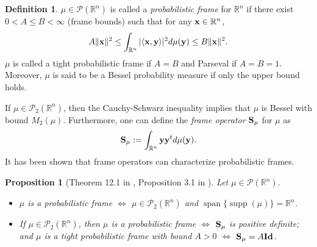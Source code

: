 \documentclass{amsart}
\numberwithin{equation}{section}
\DeclareMathOperator{\supp}{supp}
\DeclareMathOperator{\spanning}{span}
\theoremstyle{plain}
\newtheorem{proposition}[theorem]{Proposition}
\theoremstyle{definition}
\newtheorem{definition}[theorem]{Definition}
\begin{document}
\begin{definition}
$\mu \in  \mathcal{P}(\mathbb{R}^n)$ is called a \textit{probabilistic frame} for $\mathbb{R}^n$ if there exist $0<A \leq B < \infty$ (frame bounds) such that for any ${\bf x} \in \mathbb{R}^n$, 
\begin{equation*}
    A \Vert {\bf x}  \Vert^2 \leq\int_{\mathbb{R}^n} \vert \langle {\bf x},{\bf y} \rangle \vert ^2 d\mu({\bf y})  \leq B \Vert {\bf x}  \Vert^2.
\end{equation*}
$\mu$ is called a tight probabilistic frame if $A = B$ and Parseval if $A = B=1$. Moreover, $\mu$ is said to be a Bessel probability measure if only the upper bound holds. 
\end{definition}


If $\mu \in  \mathcal{P}_2(\mathbb{R}^n)$, then the Cauchy-Schwarz inequality implies that $\mu$ is Bessel with bound $M_2(\mu) $. Furthermore, one can define the \textit{frame operator} ${\bf S}_\mu$ for $\mu$  as 
    \begin{equation*}
          {\bf S}_\mu := \int_{\mathbb{R}^n}  {\bf y} {\bf y}^t d \mu({\bf y}).
    \end{equation*}
It has been shown that frame operators can characterize probabilistic frames. 


 \begin{proposition}[Theorem 12.1 in \cite{ehler2013probabilistic}, Proposition 3.1 in \cite{maslouhi2019probabilistic}] \label{TAcharacterization}
Let $\mu  \in \mathcal{P}(\mathbb{R}^n)$. 
\begin{itemize}
    \item[$(1)$] $\mu$ is a probabilistic frame  $\Leftrightarrow$ $\mu \in \mathcal{P}_2(\mathbb{R}^n)$ and $\spanning\{\supp(\mu)\} = \mathbb{R}^n$.
    
     \item[$(2)$] If $\mu  \in \mathcal{P}_2(\mathbb{R}^n)$, then $\mu$ is a probabilistic frame   $\Leftrightarrow$ ${\bf S}_{\mu}$ is positive definite; and $\mu$ is a tight probabilistic frame with bound $A > 0$ $\Leftrightarrow$ ${\bf S}_{\mu} = A {\bf Id}$. 
\end{itemize}
\end{proposition}
\end{document}
